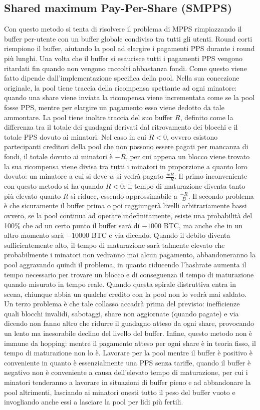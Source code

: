 \subsection{Shared maximum Pay-Per-Share (SMPPS)}

Con questo metodo si tenta di risolvere il problema di MPPS rimpiazzando il buffer per-utente con un buffer globale condiviso tra tutti gli utenti. Round corti riempiono il buffer, aiutando la pool ad elargire i pagamenti PPS durante i round più lunghi. Una volta che il buffer si esaurisce tutti i pagamenti PPS vengono ritardati fin quando non vengono raccolti abbastanza fondi. Come questo viene fatto dipende dall'implementazione specifica della pool.
Nella sua concezione originale, la pool tiene traccia della ricompensa spettante ad ogni minatore: quando una share viene inviata la ricompensa viene incrementata come se la pool fosse PPS, mentre per elargire un pagamento esso viene dedotto da tale ammontare. La pool tiene inoltre traccia del suo buffer $R$, definito come la differenza tra il totale dei guadagni derivati dal ritrovamento dei blocchi e il totale PPS dovuto ai minatori.
Nel caso in cui $R < 0$, ovvero esistono partecipanti creditori della pool che non possono essere pagati per mancanza di fondi, il totale dovuto ai minatori è $-R$, per cui appena un blocco viene trovato la sua ricompensa viene divisa tra tutti i minatori in proporzione a quanto loro dovuto: un minatore a cui si deve $w$ si vedrà pagato $\frac{wB}{-R}$.
Il primo inconveniente con questo metodo si ha quando $R<0$: il tempo di maturazione diventa tanto più elevato quanto $R$ si riduce, essendo approssimabile a $\frac{-R}{B}$.
Il secondo problema è che sicuramente il buffer prima o poi raggiungerà livelli arbitrariamente bassi ovvero, se la pool continua ad operare indefinitamente, esiste una probabilità del 100\% che ad un certo punto il buffer sarà di $-1000$ BTC, ma anche che in un altro momento sarà $-10000$ BTC e via dicendo. Quando il debito diventa sufficientemente alto, il tempo di maturazione sarà talmente elevato che probabilmente i minatori non vedranno mai alcun pagamento, abbandoneranno la pool aggravando quindi il problema, in quanto riducendo l'hashrate aumenta il tempo necessario per trovare un blocco e di conseguenza il tempo di maturazione quando misurato in tempo reale. Quando questa spirale distruttiva entra in scena, chiunque abbia un qualche credito con la pool non lo vedrà mai saldato.
Un terzo problema è che tale collasso accadrà prima del previsto: inefficienze quali blocchi invalidi, sabotaggi, share non aggiornate (quando pagate) e via dicendo non fanno altro che ridurre il guadagno atteso da ogni share, provocando un lento ma inesorabile declino del livello del buffer.
Infine, questo metodo non è immune da hopping: mentre il pagamento atteso per ogni share è in teoria fisso, il tempo di maturazione non lo è. Lavorare per la pool mentre il buffer è positivo è conveniente in quanto è essenzialmente una PPS senza tariffe, quando il buffer è negativo non è conveniente a causa dell'elevato tempo di maturazione, per cui i minatori tenderanno a lavorare in situazioni di buffer pieno e ad abbandonare la pool altrimenti, lasciando ai minatori onesti tutto il peso del buffer vuoto e invogliando anche essi a lasciare la pool per lidi più fertili.

